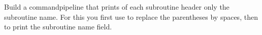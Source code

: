   Build a commandpipeline that prints of each subroutine header only
  the subroutine name. For this you first use  to replace the
  parentheses by spaces, then  to print the subroutine name
  field.
